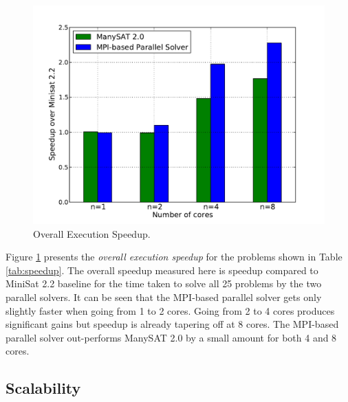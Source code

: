 \documentclass[letterpaper, compsoc, conference]{IEEEtran}
\begin{document}
\begin{figure}[htbp]
    \begin{center}
        \includegraphics[width=\columnwidth]{images/speedup1.pdf}
        \caption{Overall Execution Speedup.}
        \label{fig:speedup}
    \end{center}
\end{figure}

Figure \ref{fig:speedup} presents the \emph{overall execution speedup} for the
problems shown in Table \ref{tab:speedup}. The overall speedup measured here is
speedup compared to MiniSat 2.2 baseline for the time taken to solve all 25
problems by the two parallel solvers. It can be seen that the MPI-based
parallel solver gets only slightly faster when going from 1 to 2 cores. Going
from 2 to 4 cores produces significant gains but speedup is already tapering
off at 8 cores. The MPI-based parallel solver out-performs ManySAT 2.0 by a
small amount for both 4 and 8 cores.

\subsection{Scalability}
\label{sec:scalability}
\end{document}
